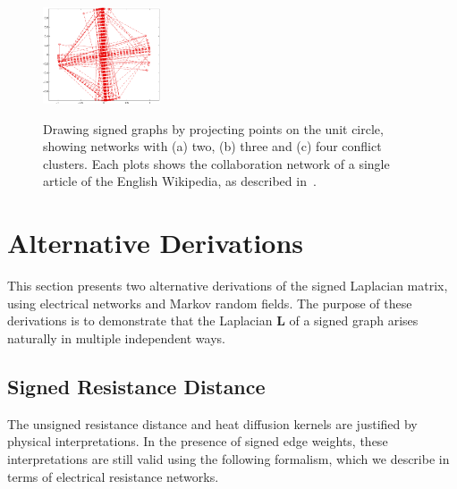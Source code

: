 \documentclass[11pt,a4paper]{book}
\newcommand{\wThree}{0.31}
\begin{document}
\begin{figure}[h!]
{    \includegraphics[width=\wThree\textwidth]{img-sgd/wiki.Criticism_of_Prem_Rawat.r.graph}
  }
  \caption{
    Drawing signed graphs by projecting points on the unit circle,
    showing networks with (a) two, (b) three and (c) four
    conflict clusters.  
    Each plots shows the 
    collaboration network of a single article of the English Wikipedia, as
    described in~\cite{b390}. 
  }
  \label{fig:cos}
\end{figure}

\section{Alternative Derivations}
\label{sec:alternative-signed}
This section presents two alternative derivations of the signed Laplacian
matrix, using electrical networks and Markov random fields.  The purpose
of these derivations is to demonstrate that the Laplacian
$\mathbf L$ of a signed graph arises naturally in multiple independent ways. 

\subsection{Signed Resistance Distance}
\label{sec:signed:elec}
The unsigned resistance distance and heat diffusion kernels
are justified by physical interpretations.  In the
presence of signed edge weights, these interpretations are still valid using
the following formalism, which we describe in terms of electrical
resistance networks.
\end{document}
